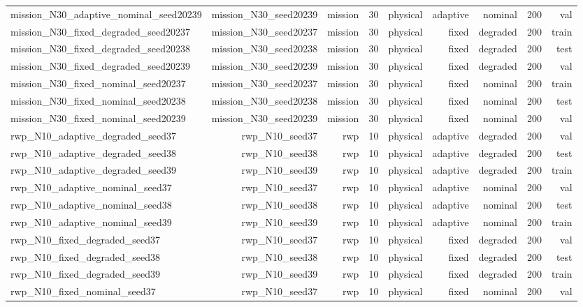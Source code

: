 \begin{tabular}{lrrrrrrrr}
mission\_N30\_adaptive\_nominal\_seed20239 & mission\_N30\_seed20239 & mission & 30 & physical & adaptive & nominal & 200 & val \\
mission\_N30\_fixed\_degraded\_seed20237 & mission\_N30\_seed20237 & mission & 30 & physical & fixed & degraded & 200 & train \\
mission\_N30\_fixed\_degraded\_seed20238 & mission\_N30\_seed20238 & mission & 30 & physical & fixed & degraded & 200 & test \\
mission\_N30\_fixed\_degraded\_seed20239 & mission\_N30\_seed20239 & mission & 30 & physical & fixed & degraded & 200 & val \\
mission\_N30\_fixed\_nominal\_seed20237 & mission\_N30\_seed20237 & mission & 30 & physical & fixed & nominal & 200 & train \\
mission\_N30\_fixed\_nominal\_seed20238 & mission\_N30\_seed20238 & mission & 30 & physical & fixed & nominal & 200 & test \\
mission\_N30\_fixed\_nominal\_seed20239 & mission\_N30\_seed20239 & mission & 30 & physical & fixed & nominal & 200 & val \\
rwp\_N10\_adaptive\_degraded\_seed37 & rwp\_N10\_seed37 & rwp & 10 & physical & adaptive & degraded & 200 & val \\
rwp\_N10\_adaptive\_degraded\_seed38 & rwp\_N10\_seed38 & rwp & 10 & physical & adaptive & degraded & 200 & test \\
rwp\_N10\_adaptive\_degraded\_seed39 & rwp\_N10\_seed39 & rwp & 10 & physical & adaptive & degraded & 200 & train \\
rwp\_N10\_adaptive\_nominal\_seed37 & rwp\_N10\_seed37 & rwp & 10 & physical & adaptive & nominal & 200 & val \\
rwp\_N10\_adaptive\_nominal\_seed38 & rwp\_N10\_seed38 & rwp & 10 & physical & adaptive & nominal & 200 & test \\
rwp\_N10\_adaptive\_nominal\_seed39 & rwp\_N10\_seed39 & rwp & 10 & physical & adaptive & nominal & 200 & train \\
rwp\_N10\_fixed\_degraded\_seed37 & rwp\_N10\_seed37 & rwp & 10 & physical & fixed & degraded & 200 & val \\
rwp\_N10\_fixed\_degraded\_seed38 & rwp\_N10\_seed38 & rwp & 10 & physical & fixed & degraded & 200 & test \\
rwp\_N10\_fixed\_degraded\_seed39 & rwp\_N10\_seed39 & rwp & 10 & physical & fixed & degraded & 200 & train \\
rwp\_N10\_fixed\_nominal\_seed37 & rwp\_N10\_seed37 & rwp & 10 & physical & fixed & nominal & 200 & val \\

\end{tabular}
